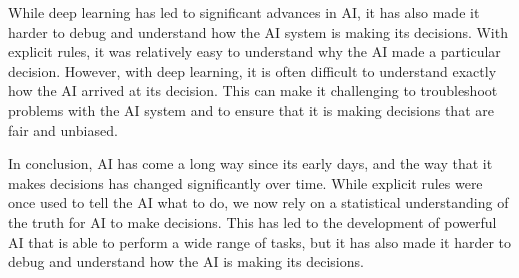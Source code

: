 While deep learning has led to significant advances in AI, it has also made it harder to debug and understand how the AI system is making its decisions. With explicit rules, it was relatively easy to understand why the AI made a particular decision. However, with deep learning, it is often difficult to understand exactly how the AI arrived at its decision. This can make it challenging to troubleshoot problems with the AI system and to ensure that it is making decisions that are fair and unbiased.

In conclusion, AI has come a long way since its early days, and the way that it makes decisions has changed significantly over time. While explicit rules were once used to tell the AI what to do, we now rely on a statistical understanding of the truth for AI to make decisions. This has led to the development of powerful AI that is able to perform a wide range of tasks, but it has also made it harder to debug and understand how the AI is making its decisions.
